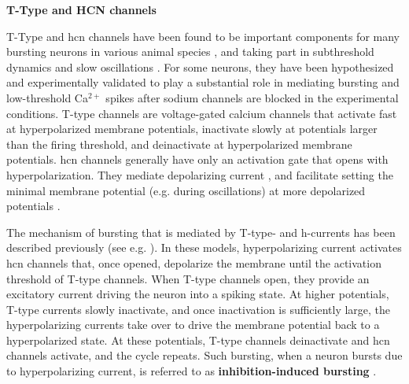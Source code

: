 \documentclass[../main.tex]{subfiles}
\begin{document}
\noindent\textbf{T-Type and HCN channels}

T-Type and \gls{hcn} channels have been found to be important components for many bursting neurons in various animal species \parencite{amarilloInterplaySevenSubthreshold2014,vickstromTTypeCalciumChannels2020,destexheModelInwardCurrent1993},
and taking part in subthreshold dynamics and slow oscillations \parencite{wangMultipleDynamicalModes1994}.
For some neurons, they have been hypothesized and experimentally validated to play a substantial role in mediating bursting and low-threshold Ca$^{2+}$ spikes after sodium channels are blocked in the experimental conditions. %
T-type channels are voltage-gated calcium channels that activate fast at hyperpolarized membrane potentials, inactivate slowly at potentials larger than the firing threshold, and deinactivate at hyperpolarized membrane potentials. \gls{hcn} channels generally have only an activation gate that opens with hyperpolarization. They mediate depolarizing current \parencite{destexheModelInwardCurrent1993}, and facilitate setting the minimal membrane potential (e.g. during oscillations) at more depolarized potentials \parencite{liuMultipleConductancesCooperatively2008}.

The mechanism of bursting that is mediated by T-type- and h-currents has been described previously (see e.g. \parencite{liuMultipleConductancesCooperatively2008}). In these models, hyperpolarizing current activates \gls{hcn} channels that, once opened, depolarize the membrane until the activation threshold of T-type channels. When T-type channels open, they provide an excitatory current driving the neuron into a spiking state.
At higher potentials, T-type currents slowly inactivate, and once inactivation is sufficiently large, the hyperpolarizing currents take over to drive the membrane potential back to a hyperpolarized state.
At these potentials, T-type channels deinactivate and \gls{hcn} channels activate, and the cycle repeats. Such bursting, when a neuron bursts due to hyperpolarizing current, is referred to as \textbf{inhibition-induced bursting} \parencite{izhikevichDynamicalSystemsNeuroscience2006}.
\end{document}
